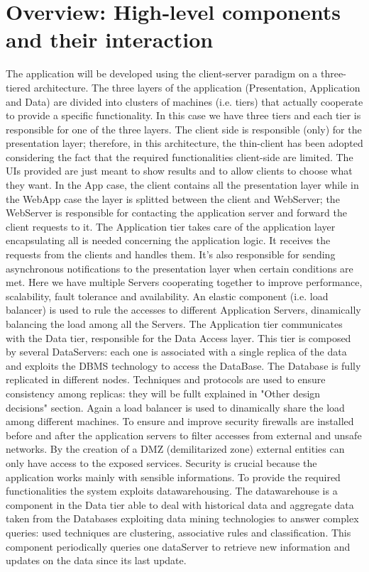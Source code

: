 \documentclass[a4paper]{report}
\begin{document}
\section{Overview: High­‐level components and their	interaction}
The application will be developed using the client-server paradigm on a three-tiered architecture. The three layers of the application (Presentation, Application and Data) are divided into clusters of machines (i.e. tiers) that actually cooperate to provide a specific functionality. In this case we have three tiers  and each tier is responsible for one of the three layers. The client side is responsible (only) for the presentation layer; therefore, in this architecture, the thin-client has been adopted considering the fact that the required functionalities client-side are limited. The UIs provided are just meant to show results and to allow clients to choose what they want.  In the App case, the client contains all the presentation layer while in the WebApp case the layer is splitted between the client and WebServer; the WebServer is responsible for contacting the application server and forward the client requests to it. The Application tier takes care of the application layer encapsulating all is needed concerning the application logic. It receives the requests from the clients and handles them. It's also responsible for sending asynchronous notifications to the presentation layer when certain conditions are met.  Here we have multiple Servers cooperating together to improve performance, scalability, fault tolerance and availability. An elastic component (i.e. load balancer) is used to rule the accesses to different Application Servers, dinamically balancing the load among all the Servers. The Application tier communicates with the Data tier, responsible for the Data Access layer. This tier is composed by several DataServers: each one is associated with a single replica of the data and exploits the DBMS technology to access the DataBase. The Database is fully replicated in different nodes. Techniques and protocols are used to ensure consistency among replicas: they will be fullt explained in "Other design decisions" section. Again a load balancer is used to dinamically share the load among different machines. 
To ensure and improve security firewalls are installed before and after the application servers to filter accesses from external and unsafe networks. By the creation of a DMZ (demilitarized zone) external entities can only have access to the exposed services. Security is crucial because the application works mainly with sensible informations.
To provide the required functionalities the system exploits datawarehousing. The datawarehouse is a component in the Data tier able to deal with historical data and aggregate data taken from the Databases exploiting data mining technologies to answer complex queries: used techniques are clustering, associative rules and classification. This component periodically queries one dataServer to retrieve new information and updates on the data since its last update. 
\end{document}
